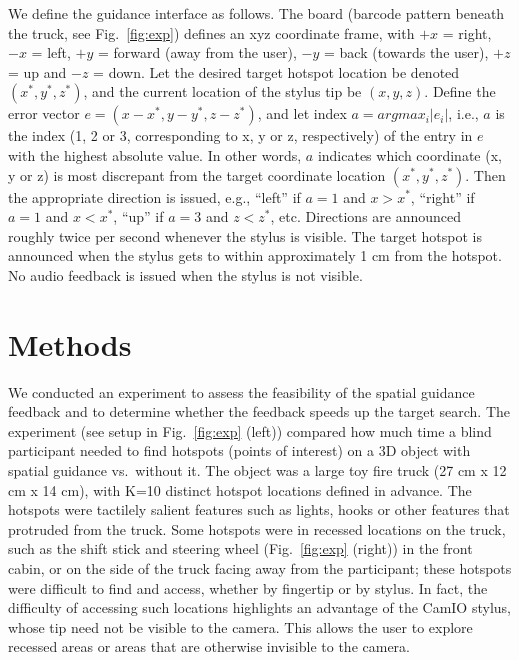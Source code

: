 \documentclass[runningheads]{res/templates/llncs}
\begin{document}
We define the guidance interface as follows. The board (barcode pattern beneath the truck, see Fig.~\ref{fig:exp}) defines an xyz coordinate frame, with \(+x\) = right, \(-x\) = left, \(+y\) = forward (away from the user), \(-y\) = back (towards the user), \(+z\) = up and \(-z\) = down.
Let the desired target hotspot location be denoted \((x^*, y^*, z^*)\), and the current location of the stylus tip be \((x,y,z)\). 
Define the error vector \(e = (x-x^*, y-y^*, z-z^*)\), and let index \(a = argmax_i |e_i|\), i.e., $a$ is the index (1, 2 or 3, corresponding to x, y or z, respectively) of the entry in $e$ with the highest absolute value. 
In other words, $a$ indicates which coordinate (x, y or z) is most discrepant from the target coordinate location \((x^*, y^*, z^*)\). 
Then the appropriate direction is issued, e.g., ``left'' if \(a = 1\) and \(x > x^*\), ``right'' if \(a = 1\) and \(x < x^*\), ``up'' if \(a = 3\) and \(z < z^*\), etc. 
Directions are announced roughly twice per second whenever the stylus is visible. The target hotspot is announced when the stylus gets to within approximately 1 cm from the hotspot. 
No audio feedback is issued when the stylus is not visible.

\hypertarget{exp}{%
\section{Methods}\label{exp}}

We conducted an experiment to assess the feasibility of the spatial guidance feedback and to determine whether the feedback speeds up the target search. 
The experiment (see setup in Fig.~\ref{fig:exp} (left)) compared how much time a blind participant needed to find hotspots (points of interest) on a 3D object with spatial guidance vs.~without it. 
The object was a large toy fire truck (27 cm x 12 cm x 14 cm), with K=10 distinct hotspot locations defined in advance. 
The hotspots were tactilely salient features such as lights, hooks or other features that protruded from the truck. 
Some hotspots were in recessed locations on the truck, such as the shift stick and steering wheel (Fig.~\ref{fig:exp} (right)) in the front cabin, or on the side of the truck facing away from the participant; these hotspots were difficult to find and access, whether by fingertip or by stylus. 
In fact, the difficulty of accessing such locations highlights an advantage of the CamIO stylus, whose tip need not be visible to the camera. 
This allows the user to explore recessed areas or areas that are otherwise invisible to the camera.
\end{document}
